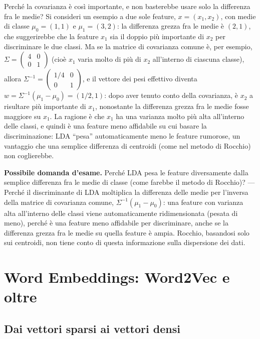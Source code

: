 \documentclass[11pt,a4paper]{report}
\newcommand{\domandaesame}[1]{\begin{esame}\textbf{Possibile domanda d'esame.} #1\end{esame}}
\begin{document}
Perché la covarianza è così importante, e non basterebbe usare solo la differenza fra le medie? Si consideri un esempio a due sole feature, $x=(x_1,x_2)$, con medie di classe $\mu_0=(1,1)$ e $\mu_1=(3,2)$: la differenza grezza fra le medie è $(2,1)$, che suggerirebbe che la feature $x_1$ sia il doppio più importante di $x_2$ per discriminare le due classi. Ma se la matrice di covarianza comune è, per esempio, $\Sigma = \begin{pmatrix}4 & 0\\0 & 1\end{pmatrix}$ (cioè $x_1$ varia molto di più di $x_2$ all'interno di ciascuna classe), allora $\Sigma^{-1} = \begin{pmatrix}1/4 & 0\\0 & 1\end{pmatrix}$, e il vettore dei pesi effettivo diventa $w = \Sigma^{-1}(\mu_1-\mu_0) = (1/2, 1)$: dopo aver tenuto conto della covarianza, è $x_2$ a risultare più importante di $x_1$, nonostante la differenza grezza fra le medie fosse maggiore su $x_1$. La ragione è che $x_1$ ha una varianza molto più alta all'interno delle classi, e quindi è una feature meno affidabile su cui basare la discriminazione: LDA ``pesa'' automaticamente meno le feature rumorose, un vantaggio che una semplice differenza di centroidi (come nel metodo di Rocchio) non coglierebbe.

\domandaesame{Perché LDA pesa le feature diversamente dalla semplice differenza fra le medie di classe (come farebbe il metodo di Rocchio)? --- Perché il discriminante di LDA moltiplica la differenza delle medie per l'inversa della matrice di covarianza comune, $\Sigma^{-1}(\mu_1-\mu_0)$: una feature con varianza alta all'interno delle classi viene automaticamente ridimensionata (pesata di meno), perché è una feature meno affidabile per discriminare, anche se la differenza grezza fra le medie su quella feature è ampia. Rocchio, basandosi solo sui centroidi, non tiene conto di questa informazione sulla dispersione dei dati.}

\chapter{Word Embeddings: Word2Vec e oltre}

\section{Dai vettori sparsi ai vettori densi}
\end{document}
